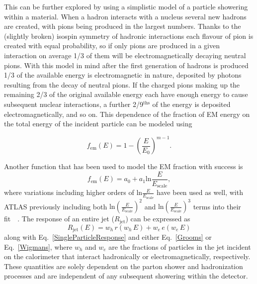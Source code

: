 This can be further explored by using a simplistic model of a particle showering within a material.  
When a hadron interacts with a nucleus several new hadrons are created, with pions being produced in the largest numbers.  
Thanks to the (slightly broken) isospin symmetry of hadronic interactions each flavour of pion is created with equal probability, so if only pions are produced in a given interaction on average 1/3 of them will be electromagnetically decaying neutral pions.  
With this model in mind after the first generation of hadrons is produced 1/3 of the available energy is electromagnetic in nature, deposited by photons resulting from the decay of neutral pions.  
If the charged pions making up the remaining 2/3 of the original available energy each have enough energy to cause subsequent nuclear interactions, a further 2/9$^{\mathrm{ths}}$ of the energy is deposited electromagnetically, and so on.  
This dependence of the fraction of EM energy on the total energy of the incident particle can be modeled using

\begin{equation}
  \label{Grooms}
  f_{\mathrm{em}}\left(E\right)=1-\left(\frac{E}{E_0}\right)^{m-1}.
\end{equation} 

\noindent 
Another function that has been used to model the EM fraction with success is 
\begin{equation}
  \label{Wigmans}
  f_{\mathrm{em}}\left(E\right)=a_0+a_1\mathrm{ln}\frac{E}{E_{\mathrm{scale}}}, 
\end{equation}
\noindent
where variations including higher orders of $\mathrm{ln}\frac{E}{E_{\mathrm{scale}}}$ have been used as well, with ATLAS previously including both $\mathrm{ln}\left(\frac{E}{E_{\mathrm{scale}}}\right)^2$ and $\mathrm{ln}\left(\frac{E}{E_{\mathrm{scale}}}\right)^3$ terms into their fit~\cite{ATLAS-CONF-2010-056}~\cite{ATLAS-CONF-2011-032}.  
The response of an entire jet ($R_{\mathrm{jet}}$) can be expressed as 
\begin{equation}
  R_{\mathrm{jet}}\left(E\right)=w_h\,r\left(w_h\,E\right)+w_e\,e\left(w_e\,E\right)
\end{equation}
\noindent 
along with Eq.~\ref{SingleParticleResponse} and either Eq.~\ref{Grooms} or Eq.~\ref{Wigmans}, where $w_h$ and  $w_e$ are the fractions of particles in the jet incident on the calorimeter that interact hadronically or electromagnetically, respectively.  
These quantities are solely dependent on the parton shower and hadronization processes and are independent of any subsequent showering within the detector.   

